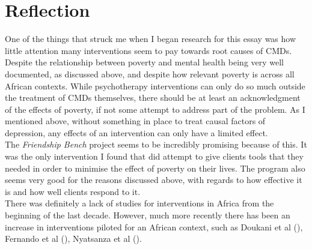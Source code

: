 \documentclass[stu,a4paper,12pt,donotrepeattitle]{apa7}
\begin{document}
\section{Reflection}
One of the things that struck me when I began research for this essay was how
little attention many interventions seem to pay towards root causes of CMDs.
Despite the relationship between poverty and mental health being very well
documented, as discussed above, and despite how relevant poverty is across all
African contexts. While psychotherapy interventions can only do so much outside
the treatment of CMDs themselves, there should be at least an acknowledgment of
the effects of poverty, if not some attempt to address part of the problem. As
I mentioned above, without something in place to treat causal factors of
depression, any effects of an intervention can only have a limited effect.\\
The \textit{Friendship Bench} project seems to be incredibly promising because
of this. It was the only intervention I found that did attempt to give clients
tools that they needed in order to minimise the effect of poverty on their lives.
The program also seems very good for the reasons discussed above, with regards
to how effective it is and how well clients respond to it.\\
There was definitely a lack of studies for interventions in Africa from the
beginning of the last decade. However, much more recently there has been an
increase in interventions piloted for an African context, such as Doukani et al
(\citeyear{douketal21}), Fernando et al (\citeyear{fernaetal21}), Nyatsanza
et al (\citeyear{nyatetal16}).
\newpage
\printbibliography
\end{document}
